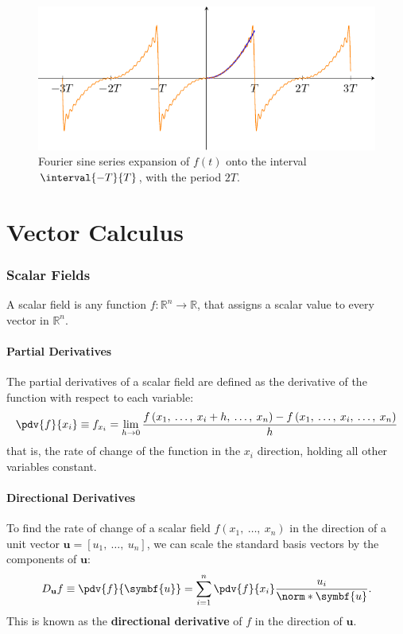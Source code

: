 \documentclass{article}
\begin{document}
\begin{figure}[H]
    \centering
    \includegraphics[width = 0.8\linewidth]{figures/half_range_expansion_Sine.pdf}
    \caption{Fourier sine series expansion of \(f\left( t \right)\) onto the interval \(\interval{-T}{T}\), with the period \(2T\).} %
\end{figure}
\part{Vector Calculus}
\section{Scalar Fields}
A scalar field is any function \(f : \mathbb{R}^n \to \mathbb{R}\),
that assigns a scalar value to every vector in \(\mathbb{R}^n\).
\subsection{Partial Derivatives}
The partial derivatives of a scalar field are defined as the derivative
of the function with respect to each variable:
\begin{equation*}
    \pdv{f}{x_i} \equiv f_{x_i} = \lim_{h \to 0} \frac{f\left( x_1, \: \ldots, \: x_i + h, \: \ldots, \: x_n \right) - f\left( x_1, \: \ldots, \: x_i, \: \ldots, \: x_n \right)}{h}
\end{equation*}
that is, the rate of change of the function in the \(x_i\) direction,
holding all other variables constant.
\subsection{Directional Derivatives}
To find the rate of change of a scalar field \(f\left( x_1, \: \ldots,
\: x_n \right)\) in the direction of a unit vector \(\mathbf{u} =
\left[ u_1, \: \ldots, \: u_n \right]\), we can scale the standard
basis vectors by the components of \(\mathbf{u}\):
\begin{equation*}
    D_{\mathbf{u}} f \equiv \pdv{f}{\symbf{u}} = \sum_{i=1}^{n} \pdv{f}{x_i} \frac{u_i}{\norm*{\symbf{u}}}.
\end{equation*}
This is known as the \textbf{directional derivative} of \(f\) in the direction of \(\mathbf{u}\).
\end{document}
